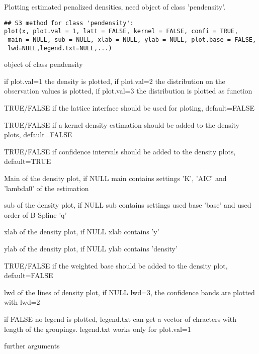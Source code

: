 \begin{Description}\relax
Plotting estimated penalized densities, need object of class 'pendensity'.
\end{Description}
\begin{Usage}
\begin{verbatim}
## S3 method for class 'pendensity':
plot(x, plot.val = 1, latt = FALSE, kernel = FALSE, confi = TRUE,
 main = NULL, sub = NULL, xlab = NULL, ylab = NULL, plot.base = FALSE,
 lwd=NULL,legend.txt=NULL,...)
\end{verbatim}
\end{Usage}
\begin{Arguments}
\begin{ldescription}
\item[\code{x}] object of class pendensity
\item[\code{plot.val}] if plot.val=1 the density is plotted, if plot.val=2 the distribution on the observation values is plotted, if plot.val=3 the distribution is plotted as function
\item[\code{latt}] TRUE/FALSE if the lattice interface should be used for ploting, default=FALSE
\item[\code{kernel}] TRUE/FALSE if a kernel density estimation should be added to the density plots, default=FALSE
\item[\code{confi}] TRUE/FALSE if confidence intervals should be added to the density plots, default=TRUE 
\item[\code{main}] Main of the density plot, if NULL main contains settings 'K', 'AIC' and 'lambda0' of the estimation
\item[\code{sub}] sub of the density plot, if NULL sub contains settings used base 'base' and used order of B-Spline 'q'
\item[\code{xlab}] xlab of the density plot, if NULL xlab contains 'y'
\item[\code{ylab}] ylab of the density plot, if NULL ylab contains 'density'
\item[\code{plot.base}] TRUE/FALSE if the weighted base should be added to the density plot, default=FALSE
\item[\code{lwd}] lwd of the lines of density plot, if NULL lwd=3, the confidence bands are plotted with lwd=2
\item[\code{legend.txt}] if FALSE no legend is plotted, legend.txt can get a vector of chracters with length of the groupings. legend.txt works only for plot.val=1
\item[\code{...}] further arguments
\end{ldescription}
\end{Arguments}
